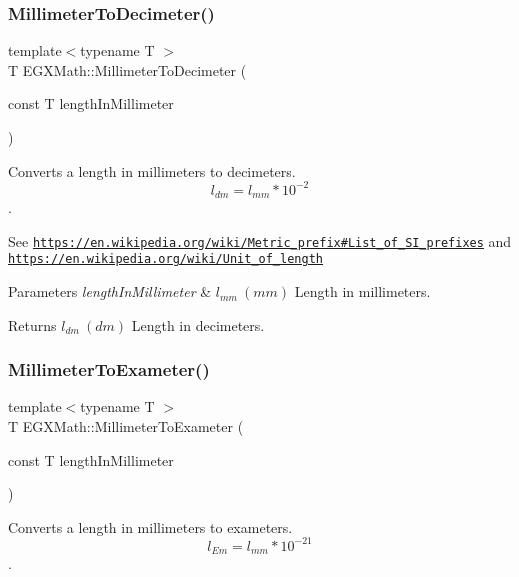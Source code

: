 \subsubsection{\texorpdfstring{Millimeter\+To\+Decimeter()}{MillimeterToDecimeter()}}
{\footnotesize\ttfamily template$<$typename T $>$ \\
T E\+G\+X\+Math\+::\+Millimeter\+To\+Decimeter (\begin{DoxyParamCaption}\item[{const T}]{length\+In\+Millimeter }\end{DoxyParamCaption})}



Converts a length in millimeters to decimeters. \[ l_{dm}=l_{mm} * 10^{-2} \]. 

See \href{https://en.wikipedia.org/wiki/Metric_prefix#List_of_SI_prefixes}{\tt https\+://en.\+wikipedia.\+org/wiki/\+Metric\+\_\+prefix\#\+List\+\_\+of\+\_\+\+S\+I\+\_\+prefixes} and \href{https://en.wikipedia.org/wiki/Unit_of_length}{\tt https\+://en.\+wikipedia.\+org/wiki/\+Unit\+\_\+of\+\_\+length} 
\begin{DoxyParams}{Parameters}
{\em length\+In\+Millimeter} & $ l_{mm}\ (mm)$ Length in millimeters. \\
\hline
\end{DoxyParams}
\begin{DoxyReturn}{Returns}
$ l_{dm}\ (dm)$ Length in decimeters. 
\end{DoxyReturn}
\mbox{\label{group___e_g_x_math-_conversions-_length_conversions-_s_i-_millimeter-_s_i_gaceb47f60171d86e6d552801e9a552530}} 
\subsubsection{\texorpdfstring{Millimeter\+To\+Exameter()}{MillimeterToExameter()}}
{\footnotesize\ttfamily template$<$typename T $>$ \\
T E\+G\+X\+Math\+::\+Millimeter\+To\+Exameter (\begin{DoxyParamCaption}\item[{const T}]{length\+In\+Millimeter }\end{DoxyParamCaption})}



Converts a length in millimeters to exameters. \[ l_{Em}=l_{mm} * 10^{-21} \]. 

